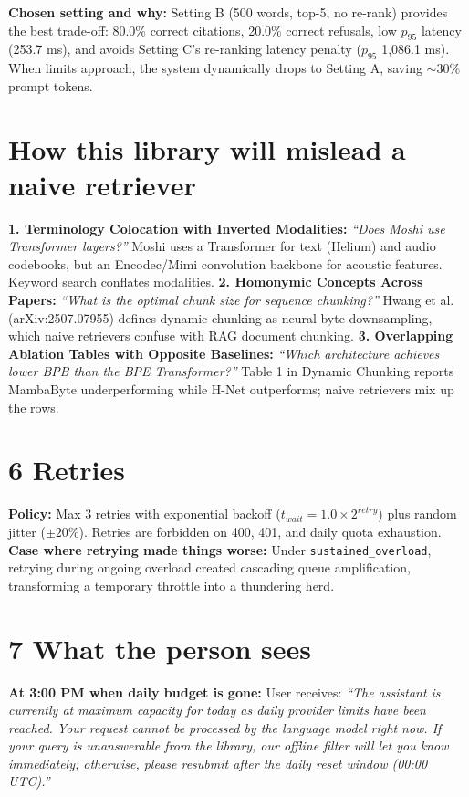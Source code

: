 \documentclass[10pt,a4paper]{article}
\begin{document}
\textbf{Chosen setting and why:} Setting B (500 words, top-5, no re-rank) provides the best trade-off: 80.0\% correct citations, 20.0\% correct refusals, low $p_{95}$ latency (253.7 ms), and avoids Setting C's re-ranking latency penalty ($p_{95}$ 1,086.1 ms). When limits approach, the system dynamically drops to Setting A, saving $\sim 30\%$ prompt tokens.

\section*{How this library will mislead a naive retriever}
\textbf{1. Terminology Colocation with Inverted Modalities:} \textit{``Does Moshi use Transformer layers?''} Moshi uses a Transformer for text (Helium) and audio codebooks, but an Encodec/Mimi convolution backbone for acoustic features. Keyword search conflates modalities.
\textbf{2. Homonymic Concepts Across Papers:} \textit{``What is the optimal chunk size for sequence chunking?''} Hwang et al. (arXiv:2507.07955) defines dynamic chunking as neural byte downsampling, which naive retrievers confuse with RAG document chunking.
\textbf{3. Overlapping Ablation Tables with Opposite Baselines:} \textit{``Which architecture achieves lower BPB than the BPE Transformer?''} Table 1 in Dynamic Chunking reports MambaByte underperforming while H-Net outperforms; naive retrievers mix up the rows.

\section*{6 Retries}
\textbf{Policy:} Max 3 retries with exponential backoff ($t_{wait} = 1.0 \times 2^{retry}$) plus random jitter ($\pm 20\%$). Retries are forbidden on 400, 401, and daily quota exhaustion.
\textbf{Case where retrying made things worse:} Under \texttt{sustained\_overload}, retrying during ongoing overload created cascading queue amplification, transforming a temporary throttle into a thundering herd.

\section*{7 What the person sees}
\textbf{At 3:00 PM when daily budget is gone:} User receives: \textit{``The assistant is currently at maximum capacity for today as daily provider limits have been reached. Your request cannot be processed by the language model right now. If your query is unanswerable from the library, our offline filter will let you know immediately; otherwise, please resubmit after the daily reset window (00:00 UTC).''}
\end{document}

